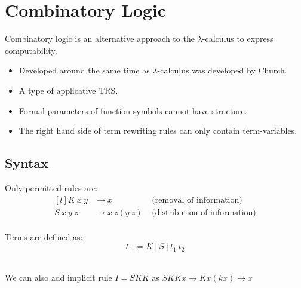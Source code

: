 \section{Combinatory Logic}
Combinatory logic is an alternative approach to the $\lambda$-calculus to express computability.
\begin{itemize}
	\item Developed around the same time as $\lambda$-calculus was developed by Church.
	\item A type of applicative TRS.
	\item Formal parameters of function symbols cannot have structure.
	\item The right hand side of term rewriting rules can only contain term-variables.
\end{itemize}
\subsection{Syntax}
\begin{minipage}[t]{.6\textwidth}
	Only permitted rules are:
	\[\begin{matrix*}[l]
			K \ x \ y &\to x  & \text{ (removal of information)}\\
			S \ x \ y \ z &\to x \ z (y \ z) & \text{ (distribution of information)}\\
		\end{matrix*}\]
\end{minipage}
\begin{minipage}[t]{.4\textwidth}
	Terms are defined as:
	\[t ::= K \ | \ S \ | \ t_1 \ t_2 \]
\end{minipage}
\vspace{2mm}
\\ We can also add implicit rule $I = SKK$ as $SKKx \to Kx(kx) \to x$

